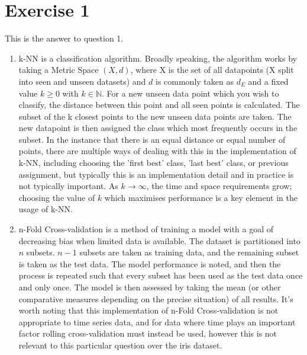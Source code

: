 \documentclass{article}
\date{}
\begin{document}
	
\section{Exercise 1}
This is the answer to question 1.
\begin{enumerate}
	
	\item k-NN is a classification algorithm. Broadly speaking, the algorithm works by taking a Metric Space $(X,d)$, where X is the set of all datapoints (X split into seen and unseen datasets) and $d$ is commonly taken as $d_E$ and a fixed value $k \ge 0$ with $k \in \mathbb{N}$. For a new unseen data point which you wish to classify, the distance between this point and all seen points is calculated. The subset of the k closest points to the new unseen data points are taken. The new datapoint is then assigned the class which most frequently occurs in the subset. In the instance that there is an equal distance or equal number of points, there are multiple ways of dealing with this in the implementation of k-NN, including choosing the 'first best' class, 'last best' class, or previous assignment, but typically this is an implementation detail and in practice is not typically important. As $k \rightarrow \infty$, the time and space requirements grow; choosing the value of $k$ which maximises performance is a key element in the usage of k-NN.
	
	\item n-Fold Cross-validation is a method of training a model with a goal of decreasing bias when limited data is available. The dataset is partitioned into $n$ subsets. $n-1$ subsets are taken as training data, and the remaining subset is taken as the test data. The model performance is noted, and then the process is repeated such that every subset has been used as the test data once and only once. The model is then assessed by taking the mean (or other comparative measures depending on the precise situation) of all results. It's worth noting that this implementation of n-Fold Cross-validation is not appropriate to time series data, and for data where time plays an important factor rolling cross-validation must instead be used, however this is not relevant to this particular question over the iris dataset.
	

\end{enumerate}
\end{document}
